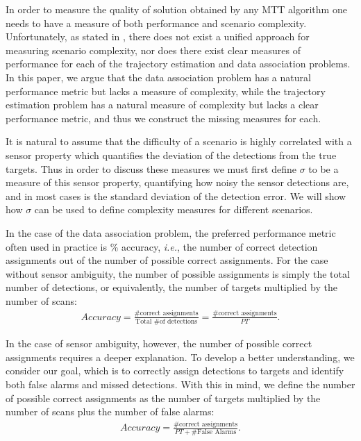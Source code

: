 
In order to measure the quality of solution obtained by any MTT algorithm one needs to have a measure of both performance and scenario complexity. Unfortunately, as stated in \cite{MTT-Taxonomy},
there does not exist a unified approach for measuring scenario complexity, nor does there exist clear measures of performance for each of the trajectory estimation and data association problems. In this paper, we argue that the data association problem has a natural performance metric but lacks a measure of complexity, while the trajectory estimation problem has a natural measure of complexity but lacks a clear performance metric, and thus we construct the missing measures for each.

It is natural to assume that the difficulty of a scenario is highly correlated with a sensor property which quantifies the deviation of the detections from the true targets. Thus in order to discuss these measures we must first define $\sigma$ to be a measure of this sensor property, quantifying how noisy the sensor detections are, and in most cases is the standard deviation of the detection error. We will show how $\sigma$ can be used to define complexity measures for different scenarios.

In the case of the data association problem, the preferred performance metric often used in practice is \% accuracy, \textit{i.e.}, the number of correct detection assignments out of the number of possible correct assignments. For the case without sensor ambiguity, the number of possible assignments is simply the total number of detections, or equivalently, the number of targets multiplied by the number of scans: 
\begin{align*}
Accuracy =  \frac{\text{\# correct assignments}}{\text{Total \# of detections}}= \frac{\text{\# correct assignments}}{PT}.
\end{align*}

In the case of sensor ambiguity, however, the number of possible correct assignments requires a deeper explanation. To develop a better understanding, we consider our goal, which is to correctly assign detections to targets and identify both false alarms and missed detections. With this in mind, we define the number of possible correct assignments as the number of targets multiplied by the number of scans plus the number of false alarms:
\begin{align*}
Accuracy =  \frac{\text{\# correct assignments}}{PT + \text{\# False Alarms}}.
\end{align*}

